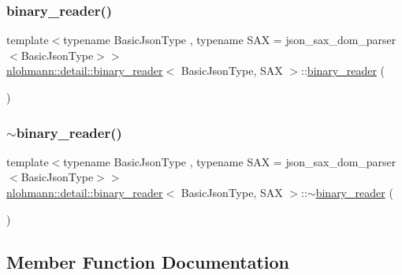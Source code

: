 \subsubsection{\texorpdfstring{binary\+\_\+reader()}{binary\_reader()}\hspace{0.1cm}{\footnotesize\ttfamily [3/3]}}
{\footnotesize\ttfamily template$<$typename Basic\+Json\+Type , typename S\+AX  = json\+\_\+sax\+\_\+dom\+\_\+parser$<$\+Basic\+Json\+Type$>$$>$ \\
\hyperlink{classnlohmann_1_1detail_1_1binary__reader}{nlohmann\+::detail\+::binary\+\_\+reader}$<$ Basic\+Json\+Type, S\+AX $>$\+::\hyperlink{classnlohmann_1_1detail_1_1binary__reader}{binary\+\_\+reader} (\begin{DoxyParamCaption}\item[{\hyperlink{classnlohmann_1_1detail_1_1binary__reader}{binary\+\_\+reader}$<$ Basic\+Json\+Type, S\+AX $>$ \&\&}]{ }\end{DoxyParamCaption})\hspace{0.3cm}{\ttfamily [default]}}

\mbox{\label{classnlohmann_1_1detail_1_1binary__reader_a18e0a63e22dbdad5f6964276b81b813a}} 
\subsubsection{\texorpdfstring{$\sim$binary\+\_\+reader()}{~binary\_reader()}}
{\footnotesize\ttfamily template$<$typename Basic\+Json\+Type , typename S\+AX  = json\+\_\+sax\+\_\+dom\+\_\+parser$<$\+Basic\+Json\+Type$>$$>$ \\
\hyperlink{classnlohmann_1_1detail_1_1binary__reader}{nlohmann\+::detail\+::binary\+\_\+reader}$<$ Basic\+Json\+Type, S\+AX $>$\+::$\sim$\hyperlink{classnlohmann_1_1detail_1_1binary__reader}{binary\+\_\+reader} (\begin{DoxyParamCaption}{ }\end{DoxyParamCaption})\hspace{0.3cm}{\ttfamily [default]}}



\subsection{Member Function Documentation}
\mbox{\label{classnlohmann_1_1detail_1_1binary__reader_a82b86133c98a0565446a44dfd3e418e6}} 
